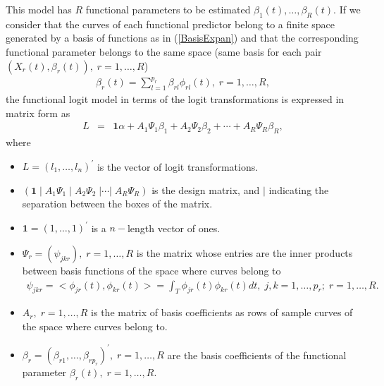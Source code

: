 This model has $R$ functional parameters to be estimated $\beta_1 \left( t\right),\ldots,\beta_R \left( t\right).$ If we consider that the curves of each functional predictor belong to a finite space generated by a basis of functions as in (\ref{BasisExpan}) and that the corresponding functional parameter belongs to the same space (same basis for each pair $(X_r(t),\beta_r(t)), \; r=1,\ldots,R$)
\begin{eqnarray}
\beta_r\left( t\right) =\sum_{l=1}^{p_r }\beta_{rl} \phi _{rl}\left( t\right), \; r=1,\ldots,R,
\label{ParamFunBasis}
\end{eqnarray}
the functional logit model in terms of the logit transformations is expressed in matrix form as
\begin{eqnarray}
L&=& \mathbf{1}\alpha + A_1 \Psi_1 \beta_1 + A_2 \Psi_2 \beta_2 + \cdots + A_R \Psi_R \beta_R,
\end{eqnarray}
where
\begin{itemize}
\item  $L=\left( l_{1},\ldots ,l_{n}\right) ^{\prime }$ is the vector of logit
transformations. 

\item  $\left( \mathbf{1}\;|\;A_1\Psi_1\;|\;A_2\Psi_2\;| \cdots |\;A_R\Psi_R \right) $ is the design matrix, and $|$
indicating the separation between the boxes of the matrix.

\item  $\mathbf{1}=\left( 1,\ldots ,1\right) ^{\prime }$ is a $n-$length vector
of ones.

\item  $\Psi_r=(\psi_{jkr}),\; r=1,\ldots,R $ is the matrix whose entries are the inner products between basis functions of the space where curves belong to
\begin{eqnarray}
\psi_{jkr}=<\phi_{jr}(t),\phi_{kr}(t)>=\int_T \phi_{jr}(t)\phi_{kr}(t)dt, \; j,k=1,\ldots,p_r; \; r=1,\ldots,R.
\label{inprod}
\end{eqnarray}

\item  $A_r,\; r=1,\ldots,R$ is the matrix of basis coefficients as rows of sample curves of the space where curves belong to.

\item  $\beta_r =\left( \beta_{r1},\ldots ,\beta_{rp_r}\right)^{\prime },\; r=1,\ldots,R$ are the basis coefficients of the
functional parameter $\beta_r(t),\; r=1,\ldots,R$.

\end{itemize}

